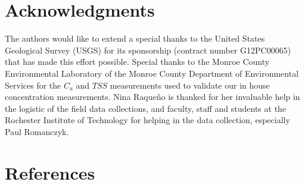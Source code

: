 \documentclass[onecolumn,3p,letterpaper]{elsarticle}
\begin{document}
\vspace{-.4cm}
\section*{Acknowledgments}
\vspace{-.2cm}
The authors would like to extend a special thanks to the United States Geological Survey (USGS) for its sponsorship (contract number G12PC00065) that has made this effort possible. Special thanks to the Monroe County Environmental Laboratory of the Monroe County Department of Environmental Services for the $C_a$ and $TSS$ measurements used to validate our in house concentration measurements. Nina Raque\~{n}o is thanked for her invaluable help in the logistic of the field data collections, and faculty, staff and students at the Rochester Institute of Technology for helping in the data collection, especially Paul Romanczyk.
\vspace{-.4cm}
\section*{References}


%

%






% 
% 

\end{document}
